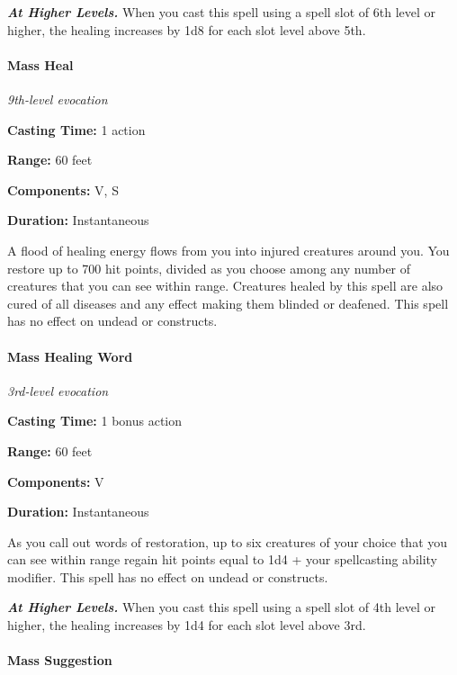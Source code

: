 \documentclass[
]{article}
\begin{document}
\emph{\textbf{At Higher Levels.}} When you cast this spell using a spell
slot of 6th level or higher, the healing increases by 1d8 for each slot
level above 5th.

\hypertarget{mass-heal}{%
\paragraph{Mass Heal}\label{mass-heal}}

\emph{9th-level evocation}

\textbf{Casting Time:} 1 action

\textbf{Range:} 60 feet

\textbf{Components:} V, S

\textbf{Duration:} Instantaneous

A flood of healing energy flows from you into injured creatures around
you. You restore up to 700 hit points, divided as you choose among any
number of creatures that you can see within range. Creatures healed by
this spell are also cured of all diseases and any effect making them
blinded or deafened. This spell has no effect on undead or constructs.

\hypertarget{mass-healing-word}{%
\paragraph{Mass Healing Word}\label{mass-healing-word}}

\emph{3rd-level evocation}

\textbf{Casting Time:} 1 bonus action

\textbf{Range:} 60 feet

\textbf{Components:} V

\textbf{Duration:} Instantaneous

As you call out words of restoration, up to six creatures of your choice
that you can see within range regain hit points equal to 1d4 + your
spellcasting ability modifier. This spell has no effect on undead or
constructs.

\emph{\textbf{At Higher Levels.}} When you cast this spell using a spell
slot of 4th level or higher, the healing increases by 1d4 for each slot
level above 3rd.

\hypertarget{mass-suggestion}{%
\paragraph{Mass Suggestion}\label{mass-suggestion}}
\end{document}
